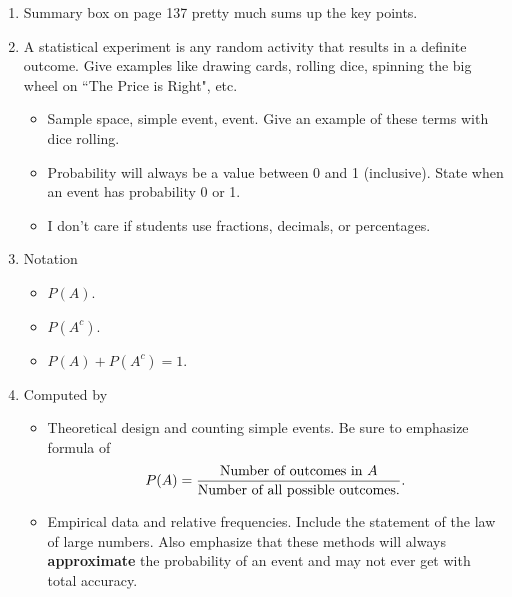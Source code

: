 \documentclass{article}
\begin{document}
\begin{enumerate}

    \item Summary box on page 137 pretty much sums up the key points.

    \item A statistical experiment is any random activity that results in a definite outcome. Give examples like drawing cards, rolling dice, spinning the big wheel on ``The Price is Right", etc.
    
        \begin{itemize}
            
            \item Sample space, simple event, event. Give an example of these terms with dice rolling.
            
            \item Probability will always be a value between 0 and 1 (inclusive). State when an event has probability 0 or 1.
            
            \item I don’t care if students use fractions, decimals, or percentages.
            
        \end{itemize}
        
    \item Notation
    
        \begin{itemize}
            
            \item $P(A)$.
            
            \item $P(A^c)$.
            
            \item $P(A)+P(A^c)=1$.
            
        \end{itemize}
        
    \item Computed by
    
        \begin{itemize}
        
            \item Theoretical design and counting simple events.  Be sure to emphasize formula of $$P(A)=\frac{\textnormal{Number of outcomes in } A}{\textnormal{Number of all possible outcomes.}}.$$
            
            
            \item Empirical data and relative frequencies. Include the statement of the law of large numbers. Also emphasize that these methods will always \textbf{approximate} the probability of an event and may not ever get with total accuracy.
            

\end{itemize}
\end{enumerate}
\end{document}
